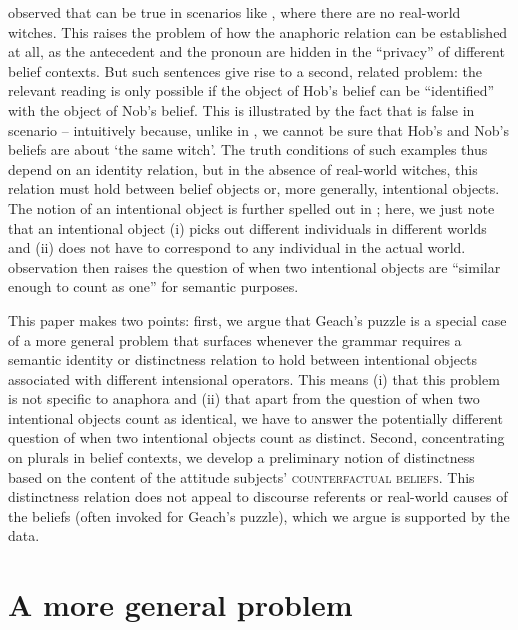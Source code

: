 \documentclass[output=paper]{langscibook}
\begin{document}
\noindent \citet{Geach:1967} observed that  can be true in scenarios like , where there are no real-world witches. This raises the problem of how the anaphoric relation can be established at all, as the antecedent and the pronoun are hidden in the ``privacy'' of different belief contexts. But such sentences give rise to a second, related problem: the relevant reading is only possible if the object of Hob's belief can be ``identified'' with the object of Nob's belief. This is illustrated by the fact that  is false in scenario   -- intuitively because, unlike in , we cannot be sure that Hob's and Nob's beliefs are about `the same witch'. The truth conditions of such examples thus depend on an identity relation, but in the absence of real-world witches, this relation must hold between belief objects or, more generally, intentional objects. The notion of an intentional object is further spelled out in ; here, we just note that an intentional object (i) picks out different individuals in different worlds and (ii) does not have to correspond to any individual in the actual world.  observation then raises the question of when two intentional objects are ``similar enough to count as one'' for semantic purposes.\largerpage[1.75]

This paper makes two points: first, we argue that Geach's puzzle is a special case of a more general problem that surfaces whenever the grammar requires a semantic identity or distinctness relation to hold between intentional objects associated with different intensional operators. This means (i) that this problem is not specific to anaphora and (ii) that apart from the question of when two intentional objects count as identical, we have to answer the potentially different question of when two intentional objects count as distinct. Second, concentrating on plurals in belief contexts, we develop a preliminary notion of distinctness based on the content of the attitude subjects' \textsc{counterfactual beliefs}. This distinctness relation does not appeal to discourse referents or real-world causes of the beliefs (often invoked for Geach's puzzle), which we argue is supported by the data.


\section{A more general problem}\largerpage[1.75]
\end{document}
